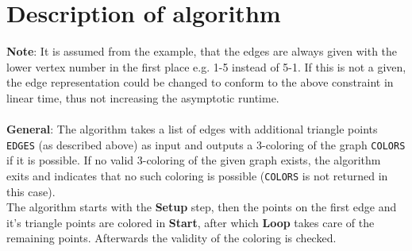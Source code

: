 \documentclass[english]{scrartcl}
\newcommand{\code}{\texttt}
\begin{document}
\section{Description of algorithm}
\label{sec:description}
\textbf{Note}: It is assumed from the example, that the edges are always given with the lower vertex number in the first place e.g. 1-5 instead of 5-1. If this is not a given, the edge representation could be changed to conform to the above constraint in linear time, thus not increasing the asymptotic runtime.
\\ \\
\textbf{General}: The algorithm takes a list of edges with additional triangle points \code{EDGES} (as described above) as input and outputs a 3-coloring of the graph \code{COLORS} if it is possible. If no valid 3-coloring of the given graph exists, the algorithm exits and indicates that no such coloring is possible (\code{COLORS} is not returned in this case).
\\
The algorithm starts with the \textbf{Setup} step, then the points on the first edge and it's triangle points are colored in \textbf{Start}, after which \textbf{Loop} takes care of the remaining points. Afterwards the validity of the coloring is checked. 
\end{document}
